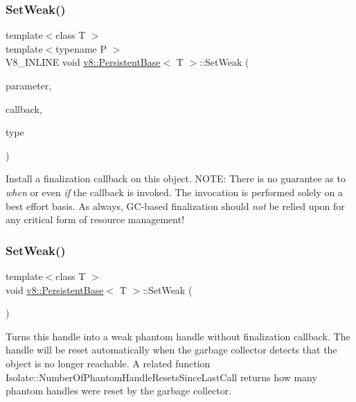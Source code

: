 \subsubsection{\texorpdfstring{Set\+Weak()}{SetWeak()}\hspace{0.1cm}{\footnotesize\ttfamily [1/2]}}
{\footnotesize\ttfamily template$<$class T $>$ \\
template$<$typename P $>$ \\
V8\+\_\+\+I\+N\+L\+I\+NE void \mbox{\hyperlink{classv8_1_1PersistentBase}{v8\+::\+Persistent\+Base}}$<$ T $>$\+::Set\+Weak (\begin{DoxyParamCaption}\item[{P $\ast$}]{parameter,  }\item[{typename \mbox{\hyperlink{classv8_1_1WeakCallbackInfo}{Weak\+Callback\+Info}}$<$ P $>$\+::Callback}]{callback,  }\item[{Weak\+Callback\+Type}]{type }\end{DoxyParamCaption})}

Install a finalization callback on this object. N\+O\+TE\+: There is no guarantee as to {\itshape when} or even {\itshape if} the callback is invoked. The invocation is performed solely on a best effort basis. As always, G\+C-\/based finalization should {\itshape not} be relied upon for any critical form of resource management! \mbox{\label{classv8_1_1PersistentBase_a09fd1d1c3cd3ff32b91937f4d8beb1ea}} 
\subsubsection{\texorpdfstring{Set\+Weak()}{SetWeak()}\hspace{0.1cm}{\footnotesize\ttfamily [2/2]}}
{\footnotesize\ttfamily template$<$class T $>$ \\
void \mbox{\hyperlink{classv8_1_1PersistentBase}{v8\+::\+Persistent\+Base}}$<$ T $>$\+::Set\+Weak (\begin{DoxyParamCaption}{ }\end{DoxyParamCaption})}

Turns this handle into a weak phantom handle without finalization callback. The handle will be reset automatically when the garbage collector detects that the object is no longer reachable. A related function Isolate\+::\+Number\+Of\+Phantom\+Handle\+Resets\+Since\+Last\+Call returns how many phantom handles were reset by the garbage collector. \mbox{\label{classv8_1_1PersistentBase_ac4c979164b3ed4dc92319e6f5a108d3d}} 
